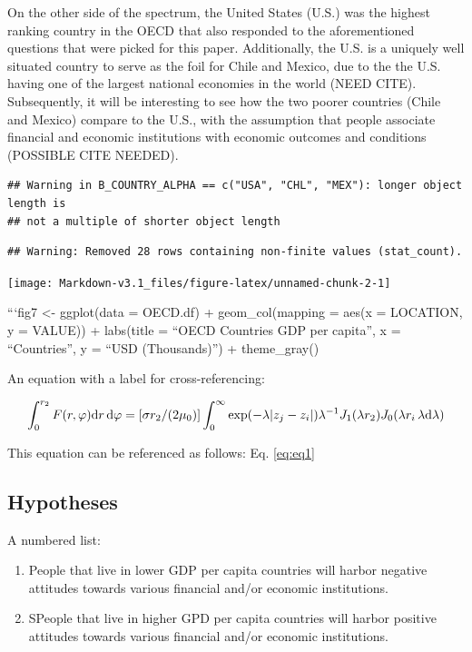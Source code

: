 \documentclass[12pt,halfline,a4paper,]{ouparticle}
\providecommand{\tightlist}{%
  \setlength{\itemsep}{0pt}\setlength{\parskip}{0pt}}
\begin{document}
On the other side of the spectrum, the United States (U.S.) was the
highest ranking country in the OECD that also responded to the
aforementioned questions that were picked for this paper. Additionally,
the U.S. is a uniquely well situated country to serve as the foil for
Chile and Mexico, due to the the U.S. having one of the largest national
economies in the world (NEED CITE). Subsequently, it will be interesting
to see how the two poorer countries (Chile and Mexico) compare to the
U.S., with the assumption that people associate financial and economic
institutions with economic outcomes and conditions (POSSIBLE CITE
NEEDED).

\begin{verbatim}
## Warning in B_COUNTRY_ALPHA == c("USA", "CHL", "MEX"): longer object length is
## not a multiple of shorter object length
\end{verbatim}

\begin{verbatim}
## Warning: Removed 28 rows containing non-finite values (stat_count).
\end{verbatim}

\texttt{[image: Markdown-v3.1\_files/figure-latex/unnamed-chunk-2-1]}

```fig7 \textless- ggplot(data = OECD.df) + geom\_col(mapping = aes(x =
LOCATION, y = VALUE)) + labs(title = ``OECD Countries GDP per capita'',
x = ``Countries'', y = ``USD (Thousands)'') + theme\_gray()

An equation with a label for cross-referencing:

\begin{equation}\label{eq:eq1}
\int^{r_2}_0 F(r,\varphi){\rm d}r\,{\rm d}\varphi = [\sigma r_2/(2\mu_0)]
\int^{\infty}_0\exp(-\lambda|z_j-z_i|)\lambda^{-1}J_1 (\lambda r_2)J_0
(\lambda r_i\,\lambda {\rm d}\lambda)
\end{equation}

This equation can be referenced as follows: Eq. \ref{eq:eq1}

\hypertarget{hypotheses}{%
\subsection{Hypotheses}\label{hypotheses}}

A numbered list:

\begin{enumerate}
\def\labelenumi{\arabic{enumi})}
\tightlist
\item
  People that live in lower GDP per capita countries will harbor
  negative attitudes towards various financial and/or economic
  institutions.
\item
  SPeople that live in higher GPD per capita countries will harbor
  positive attitudes towards various financial and/or economic
  institutions.
\end{enumerate}
\end{document}

